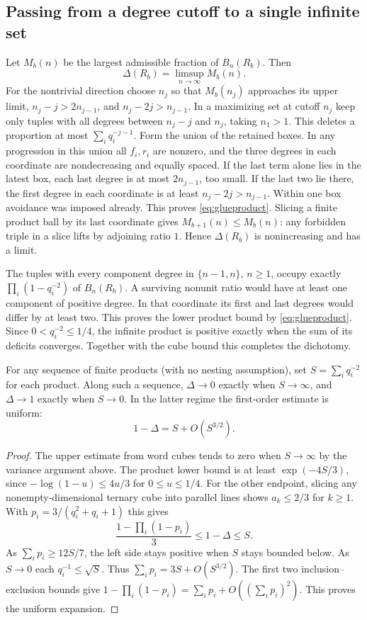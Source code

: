 \subsection{Passing from a degree cutoff to a single infinite set}
Let $M_b(n)$ be the largest admissible fraction of $B_n(R_b)$.
Then
\begin{equation}\label{eq:glueproduct}
 \Delta(R_b)=\limsup_{n\to\infty} M_b(n).
\end{equation}
For the nontrivial direction choose $n_j$ so that $M_b(n_j)$ approaches
its upper limit, $n_j-j>2n_{j-1}$, and $n_j-2j>n_{j-1}$.
In a maximizing set at cutoff $n_j$ keep only tuples with all degrees
between $n_j-j$ and $n_j$, taking $n_1>1$. This deletes a proportion
at most $\sum_i q_i^{-j-1}$. Form the union of the retained boxes.
In any progression in this union all $f_i,r_i$ are nonzero, and
the three degrees in each coordinate are nondecreasing and equally spaced.
If the last term alone lies in the latest box, each last degree is at
most $2n_{j-1}$, too small. If the last two lie there, the first degree
in each coordinate is at least $n_j-2j>n_{j-1}$. Within one box avoidance
was imposed already. This proves \eqref{eq:glueproduct}. Slicing a finite
product ball by its last coordinate gives $M_{b+1}(n)\le M_b(n)$:
any forbidden triple in a slice lifts by adjoining ratio $1$. Hence
$\Delta(R_b)$ is nonincreasing and has a limit.

The tuples with every component degree in $\{n-1,n\}$, $n\ge1$,
occupy exactly $\prod_i(1-q_i^{-2})$ of $B_n(R_b)$. A surviving nonunit
ratio would have at least one component of positive degree. In that
coordinate its first and last degrees would differ by at least two.
This proves the lower product bound by \eqref{eq:glueproduct}.
Since $0<q_i^{-2}\le1/4$, the infinite product is positive exactly when
the sum of its deficits converges. Together with the cube bound this
completes the dichotomy.

\begin{corollary}\label{cor:nearone}
For any sequence of finite products (with no nesting assumption), set
$S=\sum_i q_i^{-2}$ for each product. Along such a sequence,
$\Delta\to0$ exactly when $S\to\infty$, and $\Delta\to1$ exactly when
$S\to0$. In the latter regime the first-order estimate is uniform:
\[
 1-\Delta=S+O(S^{3/2}).
\]
\end{corollary}
\begin{proof}
The upper estimate from word cubes tends to zero when $S\to\infty$
by the variance argument above. The product lower bound is at least
$\exp(-4S/3)$, since $-\log(1-u)\le4u/3$ for $0\le u\le1/4$.
For the other endpoint, slicing any nonempty-dimensional ternary cube
into parallel lines shows $a_k\le2/3$ for $k\ge1$. With
$p_i=3/(q_i^2+q_i+1)$ this gives
\[
 \frac{1-\prod_i(1-p_i)}{3}\le 1-\Delta\le S.
\]
As $\sum_i p_i\ge12S/7$, the left side stays positive when $S$ stays
bounded below. As $S\to0$ each $q_i^{-1}\le\sqrt S$. Thus
$\sum_i p_i=3S+O(S^{3/2})$.
The first two inclusion--exclusion bounds give
$1-\prod_i(1-p_i)=\sum_i p_i+O((\sum_i p_i)^2)$. This proves the
uniform expansion.
\end{proof}

